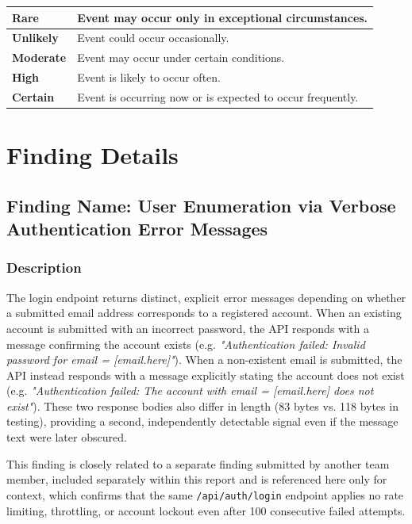 \documentclass[12pt]{article}
\begin{document}
\begin{longtable}{|p{3cm}|p{12cm}|}
\hline
\textbf{\textcolor{rare}{Rare}} & Event may occur only in exceptional circumstances. \\ \hline
\textbf{\textcolor{unlikely}{Unlikely}} & Event could occur occasionally. \\ \hline
\textbf{\textcolor{moderate}{Moderate}} & \textcolor{moderate}{Event may occur under certain conditions.} \\ \hline
\textbf{\textcolor{high}{High}} & Event is likely to occur often. \\ \hline
\textbf{\textcolor{certain}{Certain}} & Event is occurring now or is expected to occur frequently. \\ \hline
\end{longtable}

\section*{Finding Details}

\subsection*{Finding Name: User Enumeration via Verbose Authentication Error Messages}

\subsubsection*{Description}
The login endpoint returns distinct, explicit error messages depending on whether a submitted email address corresponds to a registered account. When an existing account is submitted with an incorrect password, the API responds with a message confirming the account exists (e.g. \textit{"Authentication failed: Invalid password for email = [email.here]"}). When a non-existent email is submitted, the API instead responds with a message explicitly stating the account does not exist (e.g. \textit{"Authentication failed: The account with email = [email.here] does not exist"}). These two response bodies also differ in length (83 bytes vs. 118 bytes in testing), providing a second, independently detectable signal even if the message text were later obscured.

This finding is closely related to a separate finding submitted by another team member, included separately within this report and is referenced here only for context, which confirms that the same \texttt{/api/auth/login} endpoint applies no rate limiting, throttling, or account lockout even after 100 consecutive failed attempts. 
\end{document}
